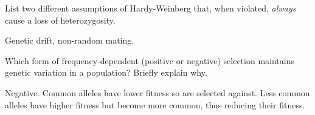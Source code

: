 \documentclass[12pt, addpoints]{exam}
\newcommand*\AnswerBox[2]{%
	\parbox[t][#1]{0.92\textwidth}{%
		\begin{solution}#2\end{solution}}
	\vspace{\stretch{1}}
}
\begin{document}
\begin{questions}
%


%
\question[4]
List two different assumptions of Hardy-Weinberg that, when violated, \emph{always} cause a loss of heterozygosity.

\AnswerBox{0.01\textheight}{Genetic drift, non-random mating.}

%
%

%

\question[4]
Which form of frequency-dependent (positive or negative) selection maintains genetic variation in a population? Briefly explain why.

\AnswerBox{0.05\textheight}{Negative. Common alleles have lower fitness so are selected against. Less common alleles have higher fitness but become more common, thus reducing their fitness.}



%
%
%


\end{questions}
\end{document}
